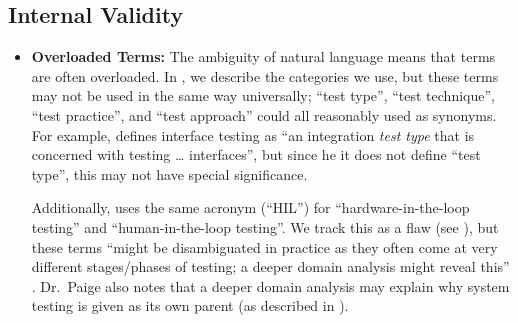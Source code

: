 \subsection{Internal Validity}\label{inter-valid}

\begin{itemize}
    \item \textbf{Overloaded Terms:} The ambiguity of natural language means
          that terms are often overloaded. In , we describe
          the categories we use, but these terms may not be used in the same
          way universally; ``test type'', ``test technique'', ``test practice'',
          and ``test approach'' could all reasonably used as synonyms. For
          example, \citet[p.~45\ifnotpaper, emphasis added\fi]{Kam2008}
          defines interface testing as ``an integration \emph{test type} that
          is concerned with testing \dots{} interfaces'', but since \ifnotpaper
              he \else it \fi does not define ``test type'', this may not have
          special significance.

          Additionally, \citet[p.~23]{Firesmith2015} uses the same acronym
          (``HIL'') for ``hardware-in-the-loop testing'' and
          ``human-in-the-loop testing''. We track this as a flaw (see
          ), but these terms ``might be disambiguated in
          practice as they often come at very different stages/phases of
          testing; a deeper domain analysis might reveal this''
          \PaigeMtgNote. Dr.~Paige also notes that a deeper domain analysis
          may explain why system testing is given as its own parent (as
          described in ).


\end{itemize}
